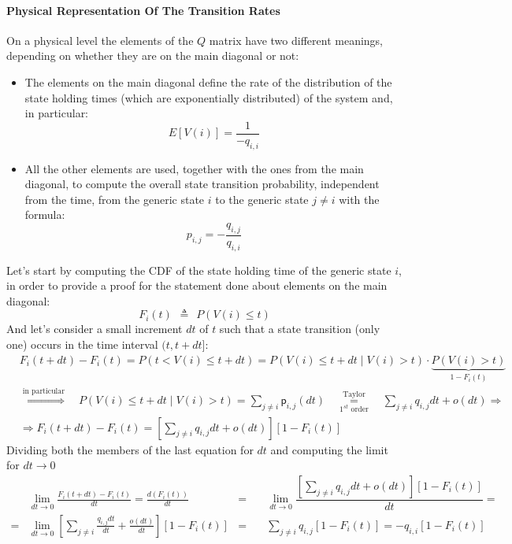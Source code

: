 \documentclass[12pt,a4paper]{article}
\newcommand*{\transp}{\mathsf{p}}
\begin{document}
\paragraph{Physical Representation Of The Transition Rates}
On a physical level the elements of the $Q$ matrix have two different meanings, depending on whether they are on the main diagonal or not:
\begin{itemize}
\item The elements on the main diagonal define the rate of the distribution of the state holding times (which are exponentially distributed) of the system and, in particular:
$$
E\left[V(i)\right]=\frac{1}{-q_{i,i}}
$$
\item All the other elements are used, together with the ones from the main diagonal, to compute the overall state transition probability, independent from the time, from the generic state $i$ to the generic state $j\neq i$ with the formula:
$$
p_{i,j}=-\frac{q_{i,j}}{q_{i,i}}
$$
\end{itemize}
Let's start by computing the CDF of the state holding time of the generic state $i$, in order to provide a proof for the statement done about elements on the main diagonal:
$$
F_i(t)\hspace{5pt}\triangleq\hspace{5pt}
P\left( V(i)\leq t \right)
$$
And let's consider a small increment $dt$ of $t$ such that a state transition (only one) occurs in the time interval $(t,t+dt]$:
\begin{align*}
&F_i(t+dt)-F_i(t)=
P\left( t < V(i) \leq t+dt\right)=
P\left(V(i) \leq t+dt \mid  V(i)>t \right)\cdot 
\underbrace{P\left(V(i)>t\right)}_{1-F_i(t)}
\\
&\overset{\textrm{in particular}}{\Rightarrow}
\quad P\left(V(i) \leq t+dt \mid  V(i)>t \right)=
\sum_{j\neq i}{\transp_{i,j}(dt)}\quad
\overset{\textrm{Taylor}}{\underset{1^{st}\textrm{ order}}{=}}\quad
\sum_{j\neq i}{q_{i,j}dt+o(dt)}
\Rightarrow\\
&\Rightarrow
F_i(t+dt)-F_i(t)
=
\left[
\sum_{j\neq i}{q_{i,j}dt+o(dt)}
\right]
\left[
1-F_i(t)
\right]
\end{align*} 
Dividing both the members of the last equation for $dt$ and computing the limit for $dt\rightarrow 0$
\begin{align*}
&\lim_{dt\rightarrow 0}{\frac{F_i(t+dt)-F_i(t)}{dt}}
=\frac{d\left(F_i(t)\right)}{dt}
&=&\quad\lim_{dt\rightarrow 0}\dfrac{
\left[
\sum_{j\neq i}{q_{i,j}dt+o(dt)}
\right]
\left[
1-F_i(t)
\right]}{dt}=
\\
=&\lim_{dt\rightarrow 0}{
\left[
\sum_{j\neq i}{\frac{q_{i,j}dt}{dt}+\frac{o(dt)}{dt}}
\right]
\left[
1-F_i(t)
\right]}
&=&\quad\sum_{j\neq i}{q_{i,j}}
\left[
1-F_i(t)
\right]=-q_{i,i}
\left[
1-F_i(t)
\right]
\end{align*}
\end{document}
